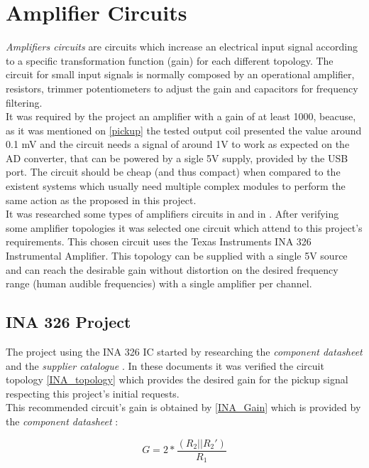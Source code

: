 \section{Amplifier Circuits}
\textit{Amplifiers circuits} \cite{amplifier-circuit} are circuits which increase
an electrical input signal according to a specific transformation function (gain)
for each different topology. The circuit for small input signals is normally
composed by an operational amplifier, resistors, trimmer potentiometers to adjust
the gain and capacitors for frequency filtering.\\
It was required by the project an amplifier with a gain of at least 1000, beacuse, as it was
mentioned on \autoref{pickup} the tested output coil presented the value around 0.1 mV and the
circuit needs a signal of around 1V to work as expected on the AD converter, that can be powered by a sigle 5V supply, provided by the USB port. The circuit
should be cheap (and thus compact) when compared to the existent systems which usually need
multiple complex modules to perform the same action as the proposed in this project. \\
It was researched some types of amplifiers circuits in 
and in . After verifying some amplifier topologies it was
selected one circuit which attend to this project's requirements.
This chosen circuit uses the Texas Instruments INA 326 Instrumental Amplifier.%
This topology
can be supplied with a single 5V source and can reach the desirable gain without
distortion on the desired frequency range (human audible frequencies) with a single
amplifier per channel.\\

\subsection{INA 326 Project}
The project using the INA 326 IC started by researching the \textit{component datasheet}
\cite{INA326} and the \textit{supplier catalogue} \cite{OpAmps}. In these documents
it was verified the circuit topology \autoref{INA_topology} which provides the
desired gain for the pickup signal respecting this project's initial requests.\\
This recommended circuit's gain is obtained by \autoref{INA_Gain} which is
provided by the \textit{component datasheet} \cite{INA326}:

\begin{equation}
  \label{INA_Gain}
  G=2*\frac{(R_2||R_2 ')}{R_1}
\end{equation}

